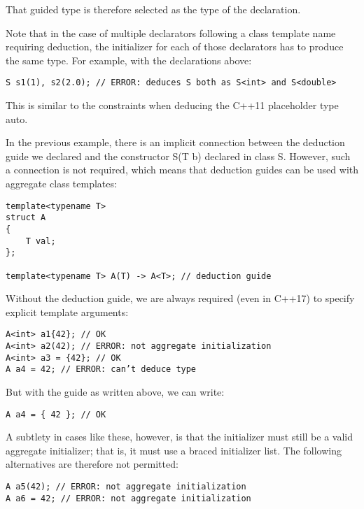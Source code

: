 That guided type is therefore selected as the type of the declaration.

Note that in the case of multiple declarators following a class template name requiring deduction, the initializer for each of those declarators has to produce the same type. For example, with the declarations above:

\begin{lstlisting}[style=styleCXX]
S s1(1), s2(2.0); // ERROR: deduces S both as S<int> and S<double>
\end{lstlisting}

This is similar to the constraints when deducing the C++11 placeholder type auto.

In the previous example, there is an implicit connection between the deduction guide we declared and the constructor S(T b) declared in class S. However, such a connection is not required, which means that deduction guides can be used with aggregate class templates:

\begin{lstlisting}[style=styleCXX]
template<typename T>
struct A
{
	T val;
};

template<typename T> A(T) -> A<T>; // deduction guide
\end{lstlisting}

Without the deduction guide, we are always required (even in C++17) to specify explicit template arguments:

\begin{lstlisting}[style=styleCXX]
A<int> a1{42}; // OK
A<int> a2(42); // ERROR: not aggregate initialization
A<int> a3 = {42}; // OK
A a4 = 42; // ERROR: can’t deduce type
\end{lstlisting}

But with the guide as written above, we can write:

\begin{lstlisting}[style=styleCXX]
A a4 = { 42 }; // OK
\end{lstlisting}

A subtlety in cases like these, however, is that the initializer must still be a valid aggregate initializer; that is, it must use a braced initializer list. The following alternatives are therefore not permitted:

\begin{lstlisting}[style=styleCXX]
A a5(42); // ERROR: not aggregate initialization
A a6 = 42; // ERROR: not aggregate initialization
\end{lstlisting}

